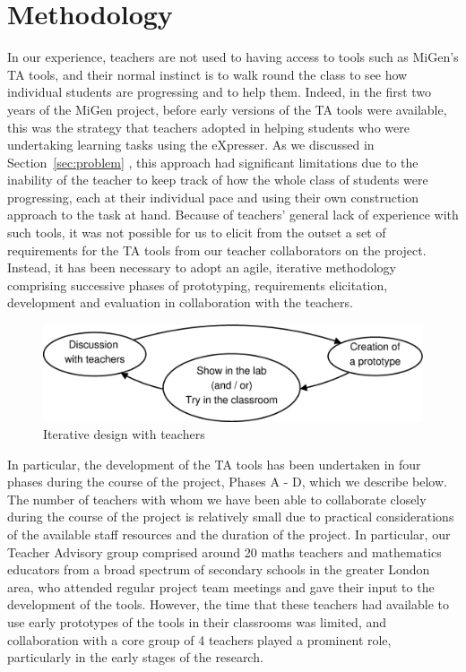 \section{Methodology}
\label{sec:methodology}

In our experience, teachers are not used to having access to tools
such as MiGen's TA tools, and their normal instinct is to walk
round the class to see how individual students are progressing and to
help them.  Indeed, in the first two years of the MiGen project,
before early versions of the TA tools were available, this was the
strategy that teachers adopted in helping students who were
undertaking learning tasks using the eXpresser.  As we discussed in
Section~\ref{sec:problem} ,
this approach had significant limitations due to the inability of the
teacher to keep track of how the whole class of students were
progressing, each at their individual pace and using their own
construction approach to the task at hand. Because of teachers'
general lack of experience with such tools, it was not possible for us
to elicit from the outset a set of requirements for the TA tools from
our teacher collaborators on the project. Instead, it has been
necessary to adopt an agile, iterative methodology comprising
successive phases of prototyping, requirements elicitation,
development and evaluation in collaboration with the teachers. 

\begin{figure}[htbp]
  \centering
  \includegraphics[width=\textwidth]{gfx/methodology.eps}
  \caption{Iterative design with teachers}
  \label{fig:it-teachers}
\end{figure}

In particular, the development of the TA tools has been undertaken in
four phases during the course of the project, Phases A - D, which we
describe below. The number of teachers with whom we have been able to
collaborate closely during the course of the project is relatively
small due to practical considerations of the available staff resources
and the duration of the project. In particular, our Teacher Advisory
group comprised around 20 maths teachers and mathematics educators
from a broad spectrum of secondary schools in the greater London area,
who attended regular project team meetings and gave their input to the
development of the tools. However, the time that these teachers had
available to use early prototypes of the tools in their classrooms was
limited, and collaboration with a core group of 4 teachers
played a prominent role, particularly in the early stages of the
research.
 
